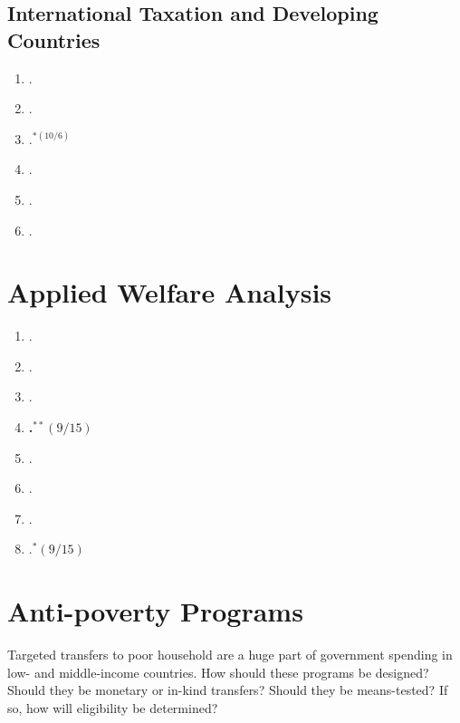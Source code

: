 \documentclass[11pt]{article}
\begin{document}
\subsection{International Taxation and Developing Countries}


\begin{enumerate}
\item {}.
\item {}.
\item {}.$^{*(10/6)}$
\item {}.
\item {}.
\item {}.
\end{enumerate}


\section{Applied Welfare Analysis}

\begin{enumerate}
\item {}.
\item {}.
\item {}.
\item \textbf{.$^{**}(9/15)$}
\item {}.
\item {}.
\item {}.
\item {}.$^{*}(9/15)$
\end{enumerate}

\section{ Anti-poverty Programs}
Targeted transfers to poor household are a huge part of government spending in low- and middle-income countries. How should these programs be designed? Should they be monetary or in-kind transfers? Should they be means-tested? If so, how will eligibility be determined?

\end{document}
